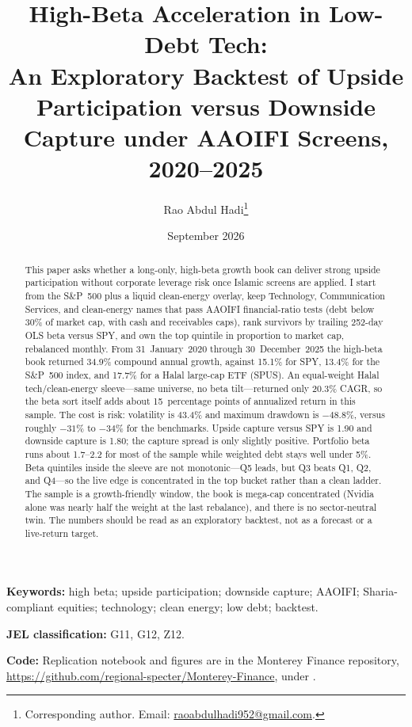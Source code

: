 \documentclass[11pt,letterpaper]{article}
\title{\textbf{High-Beta Acceleration in Low-Debt Tech:\\
An Exploratory Backtest of Upside Participation versus Downside Capture under AAOIFI Screens, 2020--2025}}
\author[1]{Rao Abdul Hadi\thanks{Corresponding author. Email: \href{mailto:raoabdulhadi952@gmail.com}{raoabdulhadi952@gmail.com}.}}
\affil[1]{Monterey Finance, Halal Quant Research Lab}
\date{September 2026}
\begin{document}
\maketitle

\begin{abstract}
\noindent
This paper asks whether a long-only, high-beta growth book can deliver strong upside participation without corporate leverage risk once Islamic screens are applied. I start from the S\&P~500 plus a liquid clean-energy overlay, keep Technology, Communication Services, and clean-energy names that pass AAOIFI financial-ratio tests (debt below 30\% of market cap, with cash and receivables caps), rank survivors by trailing 252-day OLS beta versus SPY, and own the top quintile in proportion to market cap, rebalanced monthly. From 31~January~2020 through 30~December~2025 the high-beta book returned 34.9\% compound annual growth, against 15.1\% for SPY, 13.4\% for the S\&P~500 index, and 17.7\% for a Halal large-cap ETF (SPUS). An equal-weight Halal tech/clean-energy sleeve---same universe, no beta tilt---returned only 20.3\% CAGR, so the beta sort itself adds about 15~percentage points of annualized return in this sample. The cost is risk: volatility is 43.4\% and maximum drawdown is $-48.8\%$, versus roughly $-31\%$ to $-34\%$ for the benchmarks. Upside capture versus SPY is 1.90 and downside capture is 1.80; the capture spread is only slightly positive. Portfolio beta runs about 1.7--2.2 for most of the sample while weighted debt stays well under 5\%. Beta quintiles inside the sleeve are not monotonic---Q5 leads, but Q3 beats Q1, Q2, and Q4---so the live edge is concentrated in the top bucket rather than a clean ladder. The sample is a growth-friendly window, the book is mega-cap concentrated (Nvidia alone was nearly half the weight at the last rebalance), and there is no sector-neutral twin. The numbers should be read as an exploratory backtest, not as a forecast or a live-return target.
\end{abstract}

\noindent\textbf{Keywords:}
high beta; upside participation; downside capture; AAOIFI; Sharia-compliant equities; technology; clean energy; low debt; backtest.

\noindent\textbf{JEL classification:} G11, G12, Z12.

\noindent\textbf{Code:}
Replication notebook and figures are in the Monterey Finance repository,
\url{https://github.com/regional-specter/Monterey-Finance},
under .
\end{document}
